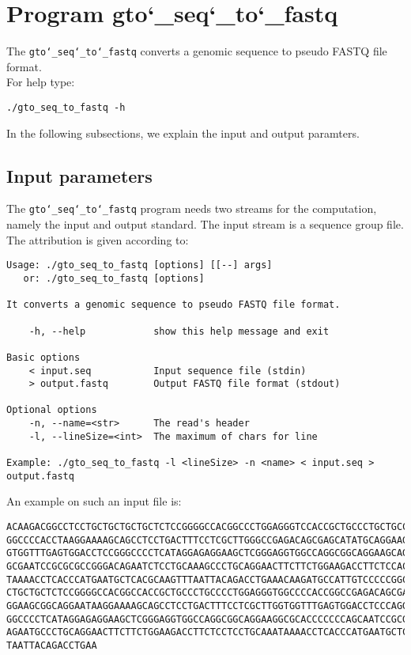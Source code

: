 \section{Program gto\char`_seq\char`_to\char`_fastq}
The \texttt{gto\char`_seq\char`_to\char`_fastq} converts a genomic sequence to pseudo FASTQ file format.\\
For help type:
\begin{lstlisting}
./gto_seq_to_fastq -h
\end{lstlisting}
In the following subsections, we explain the input and output paramters.

\subsection*{Input parameters}

The \texttt{gto\char`_seq\char`_to\char`_fastq} program needs two streams for the computation,
namely the input and output standard. The input stream is a sequence group file.\\
The attribution is given according to:
\begin{lstlisting}
Usage: ./gto_seq_to_fastq [options] [[--] args]
   or: ./gto_seq_to_fastq [options]

It converts a genomic sequence to pseudo FASTQ file format.

    -h, --help            show this help message and exit

Basic options
    < input.seq           Input sequence file (stdin)
    > output.fastq        Output FASTQ file format (stdout)

Optional options
    -n, --name=<str>      The read's header
    -l, --lineSize=<int>  The maximum of chars for line

Example: ./gto_seq_to_fastq -l <lineSize> -n <name> < input.seq > output.fastq
\end{lstlisting}
An example on such an input file is:
\begin{lstlisting}
ACAAGACGGCCTCCTGCTGCTGCTGCTCTCCGGGGCCACGGCCCTGGAGGGTCCACCGCTGCCCTGCTGCCATTGTCCCC
GGCCCCACCTAAGGAAAAGCAGCCTCCTGACTTTCCTCGCTTGGGCCGAGACAGCGAGCATATGCAGGAAGCGGCAGGAA
GTGGTTTGAGTGGACCTCCGGGCCCCTCATAGGAGAGGAAGCTCGGGAGGTGGCCAGGCGGCAGGAAGCAGGCCAGTGCC
GCGAATCCGCGCGCCGGGACAGAATCTCCTGCAAAGCCCTGCAGGAACTTCTTCTGGAAGACCTTCTCCACCCCCCCAGC
TAAAACCTCACCCATGAATGCTCACGCAAGTTTAATTACAGACCTGAAACAAGATGCCATTGTCCCCCGGCCTCCTGCTG
CTGCTGCTCTCCGGGGCCACGGCCACCGCTGCCCTGCCCCTGGAGGGTGGCCCCACCGGCCGAGACAGCGAGCATATGCA
GGAAGCGGCAGGAATAAGGAAAAGCAGCCTCCTGACTTTCCTCGCTTGGTGGTTTGAGTGGACCTCCCAGGCCAGTGCCG
GGCCCCTCATAGGAGAGGAAGCTCGGGAGGTGGCCAGGCGGCAGGAAGGCGCACCCCCCCAGCAATCCGCGCGCCGGGAC
AGAATGCCCTGCAGGAACTTCTTCTGGAAGACCTTCTCCTCCTGCAAATAAAACCTCACCCATGAATGCTCACGCAAGTT
TAATTACAGACCTGAA
\end{lstlisting}

